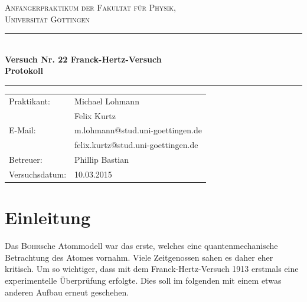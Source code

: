 \documentclass[12pt,a4paper,titlepage,headinclude,bibtotoc]{scrartcl}
\begin{document}
\begin{titlepage}
\centering
\textsc{\Large Anfängerpraktikum der Fakultät für
  Physik,\\[1.5ex] Universität Göttingen}

\vspace*{3.2cm}

\rule{\textwidth}{1pt}\\[0.5cm]
{\huge \bfseries
  Versuch Nr. 22 Franck-Hertz-Versuch\\[1.5ex]
  Protokoll}\\[0.5cm]
\rule{\textwidth}{1pt}

\vspace*{2.5cm}

\begin{Large}
\begin{tabular}{ll}
Praktikant: &  Michael Lohmann\\
 &  Felix Kurtz\\
 E-Mail: & m.lohmann@stud.uni-goettingen.de\\
 &  felix.kurtz@stud.uni-goettingen.de\\
 Betreuer: & Phillip Bastian\\
 Versuchsdatum: & 10.03.2015\\
\end{tabular}
\end{Large}

\vspace*{0.8cm}

\begin{Large}
\end{Large}

\end{titlepage}

\tableofcontents

\newpage

\section{Einleitung}
\label{sec:einleitung}
Das \textsc{Bohr}sche Atommodell war das erste, welches eine quantenmechanische Betrachtung des Atomes vornahm.
Viele Zeitgenossen sahen es daher eher kritisch.
Um so wichtiger, dass mit dem Franck-Hertz-Versuch 1913 erstmals eine experimentelle Überprüfung erfolgte.
Dies soll im folgenden mit einem etwas anderen Aufbau erneut geschehen.
\end{document}

